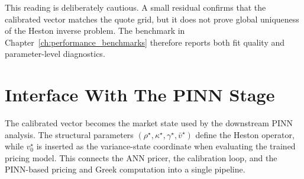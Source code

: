 This reading is deliberately cautious. A small residual confirms that the calibrated vector matches the quote grid, but it does not prove global uniqueness of the Heston inverse problem. The benchmark in Chapter~\ref{ch:performance_benchmarks} therefore reports both fit quality and parameter-level diagnostics.

\section{Interface With The PINN Stage}

The calibrated vector becomes the market state used by the downstream PINN analysis. The structural parameters \((\rho^\star,\kappa^\star,\gamma^\star,\bar v^\star)\) define the Heston operator, while \(v_0^\star\) is inserted as the variance-state coordinate when evaluating the trained pricing model. This connects the ANN pricer, the calibration loop, and the PINN-based pricing and Greek computation into a single pipeline.

